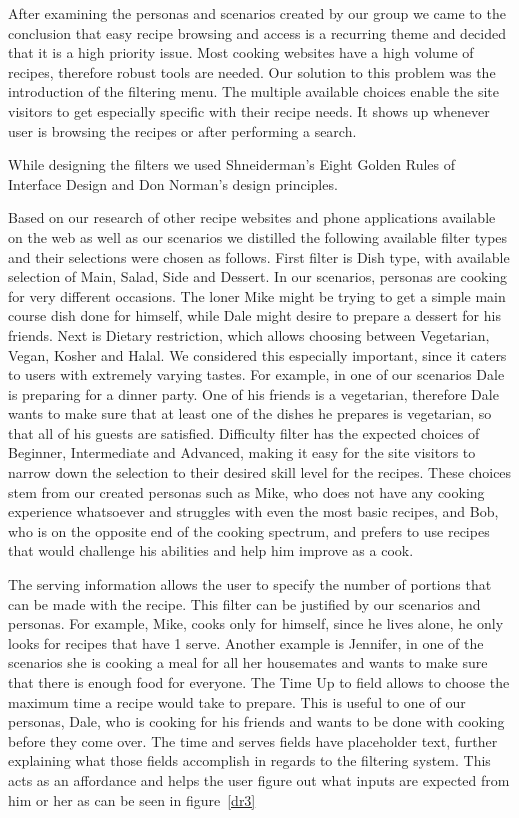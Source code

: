 After examining the personas and scenarios created by our group we came to the conclusion that easy recipe browsing and access is a recurring theme and decided that it is a high priority issue. Most cooking websites have a high volume of recipes, therefore robust tools are needed. Our solution to this problem was the introduction of the filtering menu. The multiple available choices enable the site visitors to get especially specific with their recipe needs. It shows up whenever user is browsing the recipes or after performing a search.

While designing the filters we used Shneiderman’s Eight Golden Rules of Interface Design and Don Norman’s design principles.

Based on our research of other recipe websites and phone applications available on the web as well as our scenarios we distilled the following available filter types and their selections were chosen as follows. First filter is Dish type, with available selection of Main, Salad, Side and Dessert. In our scenarios, personas are cooking for very different occasions. The loner Mike might be trying to get a simple main course dish done for himself, while Dale might desire to prepare a dessert for his friends.  Next is Dietary restriction, which allows choosing between Vegetarian, Vegan, Kosher and Halal. We considered this especially important, since it caters to users with extremely varying tastes. For example, in one of our scenarios Dale is preparing for a dinner party. One of his friends is a vegetarian, therefore Dale wants to make sure that at least one of the dishes he prepares is vegetarian, so that all of his guests are satisfied. Difficulty filter has the expected choices of Beginner, Intermediate and Advanced, making it easy for the site visitors to narrow down the selection to their desired skill level for the recipes. These choices stem from our created personas such as Mike, who does not have any cooking experience whatsoever and struggles with even the most basic recipes, and Bob, who is on the opposite end of the cooking spectrum, and prefers to use recipes that would challenge his abilities and help him improve as a cook.  

The serving information allows the user to specify the number of portions that can be made with the recipe. This filter can be justified by our scenarios and personas. For example, Mike, cooks only for himself, since he lives alone, he only looks for recipes that have 1 serve. Another example is Jennifer, in one of the scenarios she is cooking a meal for all her housemates and wants to make sure that there is enough food for everyone. The Time Up to field allows to choose the maximum time a recipe would take to prepare. This is useful to one of our personas, Dale, who is cooking for his friends and wants to be done with cooking before they come over. The time and serves fields have placeholder text, further explaining what those fields accomplish in regards to the filtering system. This acts as an affordance and helps the user figure out what inputs are expected from him or her as can be seen in figure~\ref{dr3}

